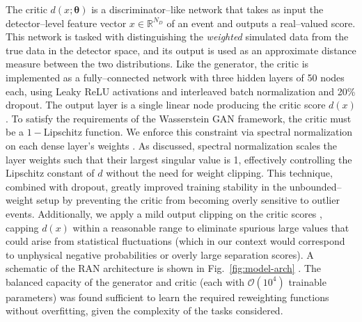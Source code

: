         The critic $d(x;\boldsymbol{\theta})$ is a discriminator--like network that takes as input the {detector--level} feature vector $x \in \mathbb{R}^{N_D}$ of an event and outputs a real--valued score.
        This network is tasked with distinguishing the \textit{weighted} simulated data from the true data in the detector space, and its output is used as an approximate distance measure between the two distributions.
        Like the generator, the critic is implemented as a fully--connected network with three hidden layers of 50 nodes each, using Leaky ReLU activations and interleaved batch normalization and 20\% dropout.
        The output layer is a single linear node producing the critic score $d(x)$.
        To satisfy the requirements of the Wasserstein GAN framework, the critic must be a \(1-\)Lipschitz function.
        We enforce this constraint via {spectral normalization} on each dense layer’s weights .
        As discussed, spectral normalization scales the layer weights such that their largest singular value is 1, effectively controlling the Lipschitz constant of $d$ without the need for weight clipping.
        This technique, combined with dropout, greatly improved training stability in the unbounded--weight setup by preventing the critic from becoming overly sensitive to outlier events.
        Additionally, we apply a mild output clipping on the critic scores , capping $d(x)$ within a reasonable range to eliminate spurious large values that could arise from statistical fluctuations (which in our context would correspond to unphysical negative probabilities or overly large separation scores).
        A schematic of the RAN architecture is shown in Fig.~\ref{fig:model-arch} .
        The balanced capacity of the generator and critic (each with $\mathcal{O}(10^4)$ trainable parameters) was found sufficient to learn the required reweighting functions without overfitting, given the complexity of the tasks considered.

